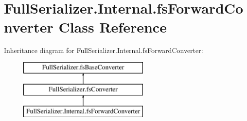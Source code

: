 \hypertarget{class_full_serializer_1_1_internal_1_1fs_forward_converter}{}\section{Full\+Serializer.\+Internal.\+fs\+Forward\+Converter Class Reference}
\label{class_full_serializer_1_1_internal_1_1fs_forward_converter}
Inheritance diagram for Full\+Serializer.\+Internal.\+fs\+Forward\+Converter\+:\begin{figure}[H]
\begin{center}
\leavevmode
\includegraphics[height=3.000000cm]{class_full_serializer_1_1_internal_1_1fs_forward_converter}
\end{center}
\end{figure}
